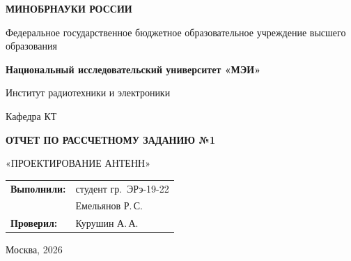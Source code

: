 \begin{titlepage}
    \centering
    {\bfseries МИНОБРНАУКИ РОССИИ\par}
    Федеральное государственное бюджетное образовательное учреждение высшего образования \\
    {\bfseries Национальный исследовательский университет «МЭИ»\par}
    \vspace{1cm}
    Институт радиотехники и электроники\par
    Кафедра КТ\par
    \vspace{3cm}
    
    {\bfseries\large ОТЧЕТ ПО РАССЧЕТНОМУ ЗАДАНИЮ №1\par}
    \vspace{0.5cm}
    {\large «ПРОЕКТИРОВАНИЕ АНТЕНН»\par}
    
    
    \vspace{3.5cm}
 \vspace{1.5cm}
\noindent\hfill
\begin{tabular}{@{}ll@{}}
    \textbf{Выполнили:} & студент гр.~ЭРэ-19-22 \\
                        & Емельянов Р.\,С. \\[0.4cm]
    \textbf{Проверил:}  & Курушин А.\,А.
\end{tabular}   
    \vfill
    {Москва, 2026}
\end{titlepage}

